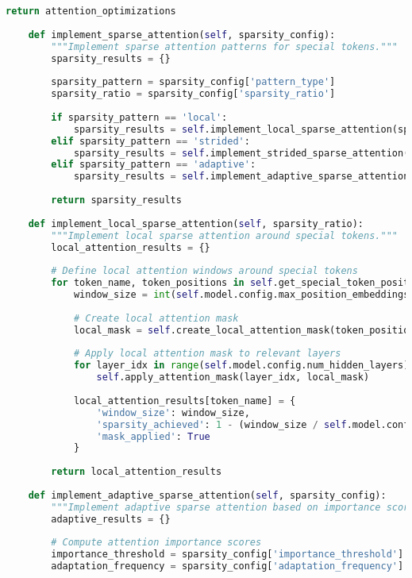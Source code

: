 \begin{lstlisting}[language=Python, caption=Comprehensive computational efficiency optimization framework]
        return attention_optimizations
    
    def implement_sparse_attention(self, sparsity_config):
        """Implement sparse attention patterns for special tokens."""
        sparsity_results = {}
        
        sparsity_pattern = sparsity_config['pattern_type']
        sparsity_ratio = sparsity_config['sparsity_ratio']
        
        if sparsity_pattern == 'local':
            sparsity_results = self.implement_local_sparse_attention(sparsity_ratio)
        elif sparsity_pattern == 'strided':
            sparsity_results = self.implement_strided_sparse_attention(sparsity_ratio)
        elif sparsity_pattern == 'adaptive':
            sparsity_results = self.implement_adaptive_sparse_attention(sparsity_config)
        
        return sparsity_results
    
    def implement_local_sparse_attention(self, sparsity_ratio):
        """Implement local sparse attention around special tokens."""
        local_attention_results = {}
        
        # Define local attention windows around special tokens
        for token_name, token_positions in self.get_special_token_positions().items():
            window_size = int(self.model.config.max_position_embeddings * (1 - sparsity_ratio))
            
            # Create local attention mask
            local_mask = self.create_local_attention_mask(token_positions, window_size)
            
            # Apply local attention mask to relevant layers
            for layer_idx in range(self.model.config.num_hidden_layers):
                self.apply_attention_mask(layer_idx, local_mask)
            
            local_attention_results[token_name] = {
                'window_size': window_size,
                'sparsity_achieved': 1 - (window_size / self.model.config.max_position_embeddings),
                'mask_applied': True
            }
        
        return local_attention_results
    
    def implement_adaptive_sparse_attention(self, sparsity_config):
        """Implement adaptive sparse attention based on importance scores."""
        adaptive_results = {}
        
        # Compute attention importance scores
        importance_threshold = sparsity_config['importance_threshold']
        adaptation_frequency = sparsity_config['adaptation_frequency']
        

\end{lstlisting}
